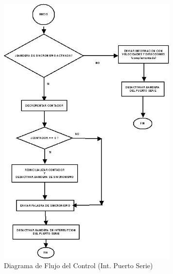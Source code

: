 \documentclass[a4paper,10pt]{article}
\begin{document}
					\newpage
					\begin{figure}[!htb]
						\centering
						\includegraphics[width=9cm]{Imagenes/DiagFlujoControl1.jpg}
						\caption{Diagrama de Flujo del Control (Int. Puerto Serie)} \label{ControlFlujo4}
					\end{figure}
\end{document}
